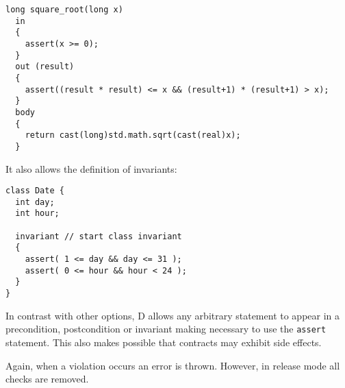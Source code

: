 \begin{lstlisting}[style=dlang]
long square_root(long x)
  in
  {
    assert(x >= 0);
  }
  out (result)
  {
    assert((result * result) <= x && (result+1) * (result+1) > x);
  }
  body
  {
    return cast(long)std.math.sqrt(cast(real)x);
  }
\end{lstlisting}

It also allows the definition of invariants:

\begin{lstlisting}[style=dlang]
class Date {
  int day;
  int hour;

  invariant // start class invariant
  {
    assert( 1 <= day && day <= 31 );
    assert( 0 <= hour && hour < 24 );
  }
}
\end{lstlisting}

In contrast with other options, D allows any arbitrary statement to appear in a
precondition, postcondition or invariant making necessary to use the
\texttt{assert} statement. This also makes possible that contracts may exhibit
side effects.

Again, when a violation occurs an error is thrown. However, in release mode all
checks are removed.
